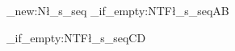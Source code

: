 \ExplSyntaxOn
\seq_new:N\l_s_seq
\seq_if_empty:NTF\l_s_seq{A}{B}

\seq_if_empty:NTF\l_s_seq{C}{D}
\ExplSyntaxOff
